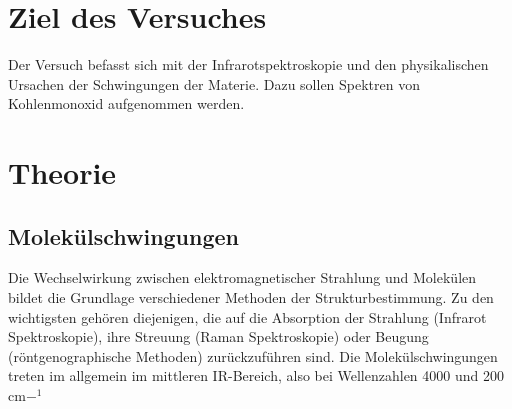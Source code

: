 \documentclass[12pt]{article}
\begin{document}
\section{Ziel des Versuches}
Der Versuch befasst sich mit der Infrarotspektroskopie und den physikalischen Ursachen der Schwingungen der Materie.
Dazu sollen Spektren von Kohlenmonoxid aufgenommen werden.
\section {Theorie} \cite{fadini}
\subsection{Molekülschwingungen}
Die Wechselwirkung zwischen elektromagnetischer Strahlung und Molekülen
bildet die Grundlage verschiedener Methoden der Strukturbestimmung. Zu den wichtigsten
gehören diejenigen, die auf die Absorption der Strahlung (Infrarot Spektroskopie),
ihre Streuung (Raman Spektroskopie) oder Beugung (röntgenographische Methoden)
zurückzuführen sind.
Die Molekülschwingungen treten im allgemein im mittleren IR-Bereich,
also bei Wellenzahlen 4000 und 200 cm$-^1$
\end{document}
